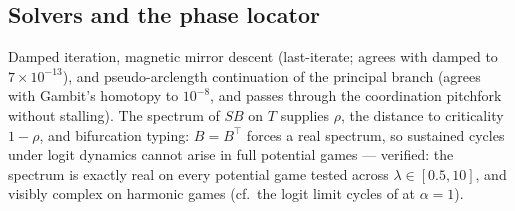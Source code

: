 \subsection{Solvers and the phase locator}
Damped iteration, magnetic mirror descent \citep{sokota2023} (last-iterate;
agrees with damped to $7\times10^{-13}$), and pseudo-arclength continuation of
the principal branch (agrees with Gambit's homotopy \citep{turocy2005} to
$10^{-8}$, and passes through the coordination pitchfork without stalling).
The spectrum of $SB$ on $T$ supplies $\rho$, the distance to criticality
$1-\rho$, and bifurcation typing: $B=B^\top$ forces a real spectrum, so
sustained cycles under logit dynamics cannot arise in full potential games ---
verified: the spectrum is exactly real on every potential game tested across
$\lambda\in[0.5,10]$, and visibly complex on harmonic games (cf.\ the logit
limit cycles of \citealt{hommes2012} at $\alpha=1$).
